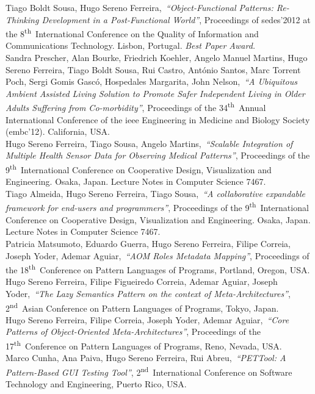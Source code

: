 \documentclass[9pt, a4paper]{article}
\newcommand{\current}{{\hspace{-0.97em}\color{feup}$\star$}~}
\newcommand{\years}[1]{\marginnote{\small #1}}
\newcommand{\nth}{\textsuperscript{th}~}
\newcommand{\nd}{\textsuperscript{nd}~}
\begin{document}
\noindent\years{\current~2012}Tiago Boldt Sousa, Hugo Sereno Ferreira,~\emph{``Object-Functional Patterns: Re-Thinking Development in a Post-Functional World''}, Proceedings of {\sc sedes'2012} at the 8\nth International Conference on the Quality of Information and Communications Technology. Lisbon, Portugal. \emph{Best Paper Award.}\\
\years{2012}Sandra Prescher, Alan Bourke, Friedrich Koehler, Angelo Manuel Martins, Hugo Sereno Ferreira, Tiago Boldt Sousa, Rui Castro, António Santos, Marc Torrent Poch, Sergi Gomis Gascó, Hospedales Margarita, John Nelson,~\emph{``A Ubiquitous Ambient Assisted Living Solution to Promote Safer Independent Living in Older Adults Suffering from Co-morbidity''}, Proceedings of the 34\nth Annual International Conference of the {\sc ieee} Engineering in
Medicine and Biology Society ({\sc embc}'12). California, USA.\\
\years{2012}Hugo Sereno Ferreira, Tiago Sousa, Angelo Martins,~\emph{``Scalable Integration of Multiple Health Sensor Data for Observing Medical Patterns''}, Proceedings of the 9\nth International Conference on Cooperative Design, Visualization and Engineering. Osaka, Japan. Lecture Notes in Computer Science 7467.\\
\years{2012}Tiago Almeida, Hugo Sereno Ferreira, Tiago Sousa,~\emph{``A collaborative expandable framework for end-users and programmers''}, Proceedings of the 9\nth International Conference on Cooperative Design, Visualization and Engineering. Osaka, Japan. Lecture Notes in Computer Science 7467.\\
\years{2011}Patricia Matsumoto, Eduardo Guerra, Hugo Sereno Ferreira, Filipe Correia, Joseph Yoder, Ademar Aguiar,~\emph{``AOM Roles Metadata Mapping''}, Proceedings of the 18\nth Conference on Pattern Languages of Programs, Portland, Oregon, USA.\\
\years{2011}Hugo Sereno Ferreira, Filipe Figueiredo Correia, Ademar Aguiar, Joseph Yoder,~\emph{``The Lazy Semantics Pattern on the context of Meta-Architectures''}, 2\nd Asian Conference on Pattern Languages of Programs, Tokyo, Japan.\\
\years{2010}Hugo Sereno Ferreira, Filipe Correia, Joseph Yoder, Ademar Aguiar,~\emph{``Core Patterns of Object-Oriented Meta-Architectures''}, Proceedings of the 17\nth Conference on Pattern Languages of Programs, Reno, Nevada, USA.\\
\years{2010}Marco Cunha, Ana Paiva, Hugo Sereno Ferreira, Rui Abreu,~\emph{``PETTool: A Pattern-Based GUI Testing Tool''}, 2\nd International Conference on Software Technology and Engineering, Puerto Rico, USA.\\
\end{document}
